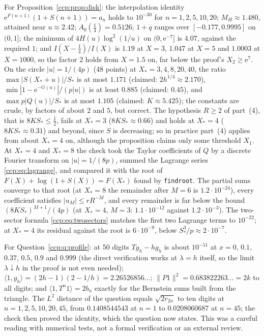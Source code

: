 \documentclass[11pt,letterpaper]{article}
\theoremstyle{remark}\newtheorem{remark}[theorem]{Remark}
\newcommand{\ee}{\mathrm e}
\newcommand{\norm}[1]{\lVert #1\rVert}
\begin{document}
For Proposition~\ref{ccp:prop:disk}: the interpolation identity
$\ee^{F(n+1)}(1+S(n+1))=a_n$ holds to $10^{-30}$ for $n=1,2,5,10,20$;
$M_H\approx1.480$, attained near $u\approx2.42$; $A_0(\frac14)=0.5126$;
$1+q$ ranges over $[-0.177,0.9995]$ on $(0,1]$; the minimum of
$4H(u)\log^2(1/u)$ on $(0,\ee^{-7}]$ is $4.07$, against the required $1$;
and $I(X-\frac14)/I(X)$ is $1.19$ at $X=3$, $1.047$ at $X=5$ and $1.0003$ at
$X=1000$, so the factor $2$ holds from $X=1.5$ on, far below the proof's
$X_2\ge\ee^7$. On the circle $|u|=1/(4p)$ (48 points) at
$X_*=3,4,8,20,40$, the ratio $\max|S(X_*+u)|/S_*$ is at most $1.171$
(claimed: $2h^{1/4}\approx2.170$), $\min|1-\ee^{-G(u)}|/(p|u|)$ is at least
$0.885$ (claimed: $0.45$), and $\max p|Q(u)|/S_*$ is at most $1.105$
(claimed: $K\approx5.425$); the constants are crude, by factors of about $2$
and $5$, but correct. The hypothesis $R\ge2$ of part~(4), that is
$8KS_*\le\frac12$, fails at $X_*=3$ ($8KS_*\approx0.66$) and holds at
$X_*=4$ ($8KS_*\approx0.31$) and beyond, since $S$ is decreasing; so in
practice part~(4) applies from about $X_*=4$ on, although the proposition
claims only some threshold $X_1$. At $X_*=4$ and $X_*=8$ the check took the
Taylor coefficients of $Q$ by a discrete Fourier transform on $|u|=1/(8p)$,
summed the Lagrange series \eqref{ccp:eq:lagrange}, and compared it with
the root of $F(X)+\log(1+S(X))=F(X_*)$ found by \texttt{findroot}. The
partial sums converge to that root (at $X_*=8$ the remainder after $M=6$ is
$1.2\cdot10^{-24}$), every coefficient satisfies $|u_M|\le rR^{-M}$, and
every remainder is far below the bound $(8KS_*)^{M+1}/(4p)$ (at $X_*=4$,
$M=3$: $1.1\cdot10^{-12}$ against $1.2\cdot10^{-3}$). The two-sector formula
\eqref{ccp:eq:twosectors} matches the first two Lagrange terms to $10^{-22}$;
at $X_*=4$ its residual against the root is $6\cdot10^{-9}$, below
$S_*^3/p\approx2\cdot10^{-7}$.

For Question~\ref{ccp:q:profile}: at 50 digits $Tg_h-hg_h$ is about
$10^{-51}$ at $x=0$, $0.1$, $0.37$, $0.5$, $0.9$ and $0.999$ (the direct
verification works at $\lambda=h$ itself, so the limit $\lambda\downarrow h$
in the proof is not even needed); $\langle1,g_h\rangle=(2h-1)(2-1/h)
=2.26526856\ldots$; $\norm{P1}^2=0.683822263\ldots=2k$ to all digits; and
$\langle1,T^n1\rangle=2b_n$ exactly for the Bernstein sums built from the
triangle. The $L^2$ distance of the question equals $\sqrt{2r_{2n}}$ to ten
digits at $n=1,2,5,10,20,45$, from $0.1408544543$ at $n=1$ to $0.0208060687$
at $n=45$; the check then proved the identity, which the question now
states. This was a careful reading with numerical tests, not a formal
verification or an external review.
\end{document}
